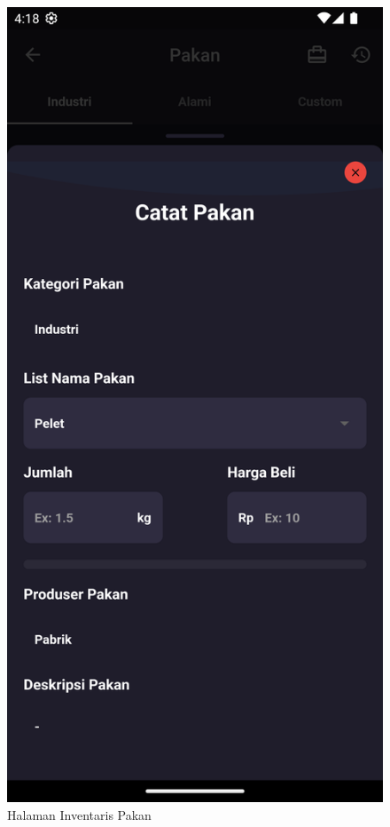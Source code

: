 \begin{spacing}{1.5}
\begin{enumerate}
\begin{enumerate}
\begin{itemize}
\begin{figure}[H]
						\caption{Halaman Inventaris Pakan}
					\endminipage\hfill
						\includegraphics[width=\linewidth]{gambar/sprint4/input_inv_pakan.png}

\end{figure}
\end{itemize}
\end{enumerate}
\end{enumerate}
\end{spacing}
